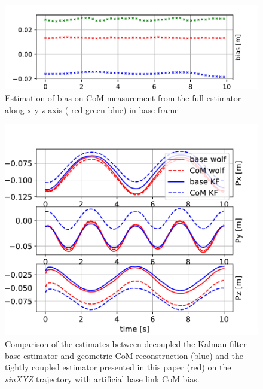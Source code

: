 \begin{figure}[t]
    \centering
    \includegraphics[width=0.8\columnwidth]{figures/centroidal/com_bias_est.pdf}
    \caption{Estimation of bias on CoM measurement from the full estimator along x-y-z axis ( red-green-blue) in base frame}
    \label{fig:bias_est}
\end{figure}

\begin{figure}[t]
    \centering
    \includegraphics[height=0.6\columnwidth]{figures/centroidal/base_com_position_wolf_vs_KF.pdf}
    \caption{Comparison of the estimates between decoupled the Kalman filter base estimator and geometric CoM reconstruction (blue) and the tightly coupled estimator presented in this paper (red) on the \textit{sinXYZ} trajectory with artificial base link CoM bias.}
    \label{fig:comparison_KF_wolf}
\end{figure}


